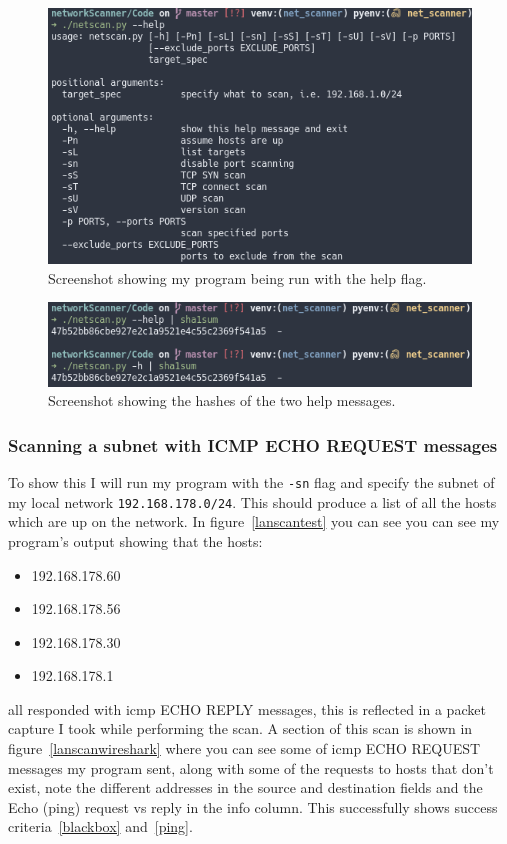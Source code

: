 \documentclass[titlepage]{article}
\let\Oldsubsubsection\subsubsection{}
\renewcommand{\subsubsection}{\FloatBarrier\Oldsubsubsection}
\begin{document}
\begin{figure}[H]
  \centering
  \includegraphics[width=\textwidth]{helpmessage.png}
  \caption{%
    Screenshot showing my program being run with the help flag.
  }\label{helpflagtest}
\end{figure}

\begin{figure}[H]
  \centering
  \includegraphics[width=\textwidth]{messagehashes.png}
  \caption{%
    Screenshot showing the hashes of the two help messages.
  }\label{messagehash}
\end{figure}

\subsubsection{Scanning a subnet with ICMP ECHO REQUEST messages}
To show this I will run my program with the \verb|-sn| flag and specify the
subnet of my local network \verb|192.168.178.0/24|.
This should produce a list of all the hosts which are up on the network.
In figure~\ref{lanscantest} you can see you can see my program's output
showing that the hosts:
\begin{itemize}
  \item{192.168.178.60}
  \item{192.168.178.56}
  \item{192.168.178.30}
  \item{192.168.178.1}
\end{itemize}
all responded with \gls{icmp} ECHO REPLY messages, this is reflected
in a packet capture I took while performing the scan. A section of this
scan is shown in figure~\ref{lanscanwireshark} where you can see some of
\gls{icmp} ECHO REQUEST messages my program sent, along with some of the requests
to hosts that don't exist, note the different addresses in the source and destination fields
and the Echo (ping) request vs reply in the info column. This successfully shows success
criteria~\ref{blackbox} and~\ref{ping}.
\end{document}
